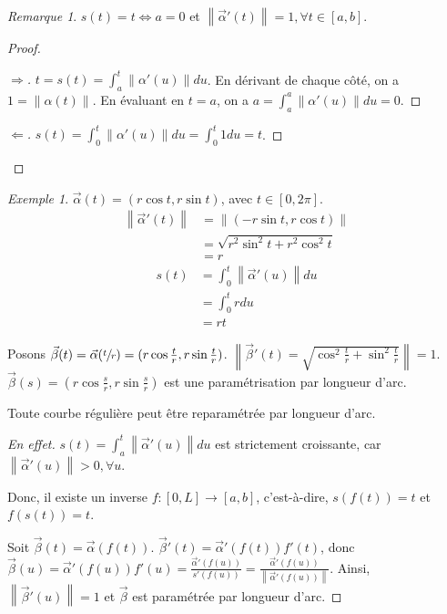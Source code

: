 \documentclass{report}
\theoremstyle{definition}
\theoremstyle{remark}
\newtheorem*{exem}{Exemple}
\newtheorem*{rmq}{Remarque}
\newenvironment*{subproof}[1][D\'emonstration]
{
\begin{proof}[#1]

}
{
\renewcommand{\qedsymbol}{$\blacksquare$}
\end{proof}
\renewcommand{\qedsymbol}{$\square$}
}
\newcommand*{\norme}[1]{\left\|#1\right\|}
\begin{document}
	\begin{rmq}
		$s(t)=t \Leftrightarrow a=0$ et $\norme{\vec\alpha'(t)}=1, \forall t\in[a,b]$.
		\begin{proof}
			\begin{subproof}[$\Rightarrow$]
				$t=s(t)=\int_{a}^{t}\norme{\alpha'(u)}du$. En d\'erivant de chaque c\^ot\'e, on a $1=\norme{\alpha(t)}$. En \'evaluant en $t=a$, on a $a=\int_{a}^{a}\norme{\alpha'(u)}du=0$.
			\end{subproof}
			\begin{subproof}[$\Leftarrow$]
				$s(t) = \int_{0}^{t} \norme{\alpha'(u)}du = \int_{0}^{t}1du = t$.
			\end{subproof}
		\end{proof}
	\end{rmq}

	\begin{exem}
		$\vec\alpha(t) = (r\cos t, r\sin t)$, avec $t\in[0,2\pi]$.
		\begin{align*}
			\norme{\vec\alpha'(t)}&= \norme{(-r\sin t, r\cos t)}\\
			&= \sqrt{r^2\sin^2t+r^2\cos^2t}\\
			&= r
		\end{align*}
		\begin{align*}
			s(t)&= \int_{0}^{t}\norme{\vec\alpha'(u)}du\\
			&= \int_{0}^{t}rdu\\
			&= rt
		\end{align*}

		Posons $\vec\beta(t) = \vec\alpha(\sfrac{t}{r}) = (r\cos\frac{t}{r}, r\sin\frac{t}{r})$. $\norme{\vec\beta'(t) = \sqrt{\cos^2\frac{t}{r} + \sin^2\frac{t}{r}}} = 1$. $\vec\beta(s) = (r\cos\frac{s}{r}, r\sin\frac{s}{r})$ est une param\'etrisation par longueur d'arc.
	\end{exem}

	Toute courbe r\'eguli\`ere peut \^etre reparam\'etr\'ee par longueur d'arc.
	\begin{proof}[En effet]
		$s(t) = \int_{a}^{t} \norme{\vec\alpha'(u)} du$ est strictement croissante, car $\norme{\vec\alpha'(u)}>0, \forall u$.

		Donc, il existe un inverse $f:[0,L]\to[a,b]$, c'est-\`a-dire, $s(f(t))=t$ et $f(s(t))=t$.

		Soit $\vec\beta(t)=\vec\alpha(f(t))$. $\vec\beta'(t) = \vec\alpha'(f(t)) f'(t)$, donc $\vec\beta(u) = \vec\alpha'(f(u))f'(u) = \frac{\vec\alpha'(f(u))}{s'(f(u))} = \frac{\vec\alpha'(f(u))}{\norme{\vec\alpha'(f(u))}}$. Ainsi, $\norme{\vec\beta'(u)}=1$ et $\vec\beta$ est param\'etr\'ee par longueur d'arc.
	\end{proof}
\end{document}
